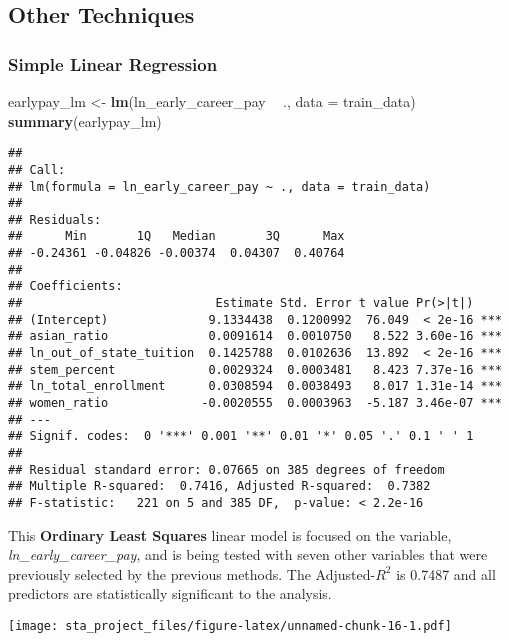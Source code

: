 \documentclass[
]{article}
\newenvironment{Shaded}{\begin{snugshade}}{\end{snugshade}}
\newcommand{\DataTypeTok}[1]{\textcolor[rgb]{0.13,0.29,0.53}{#1}}
\newcommand{\KeywordTok}[1]{\textcolor[rgb]{0.13,0.29,0.53}{\textbf{#1}}}
\newcommand{\NormalTok}[1]{#1}
\newcommand{\OperatorTok}[1]{\textcolor[rgb]{0.81,0.36,0.00}{\textbf{#1}}}
\newcommand{\StringTok}[1]{\textcolor[rgb]{0.31,0.60,0.02}{#1}}
\begin{document}
\hypertarget{other-techniques}{%
\subsection{Other Techniques}\label{other-techniques}}

\hypertarget{simple-linear-regression}{%
\subsubsection{Simple Linear
Regression}\label{simple-linear-regression}}

\begin{Shaded}
\begin{Highlighting}[]
\NormalTok{earlypay_lm <-}\StringTok{ }\KeywordTok{lm}\NormalTok{(ln_early_career_pay }\OperatorTok{~}\StringTok{ }\NormalTok{., }
                  \DataTypeTok{data =}\NormalTok{ train_data)}
\KeywordTok{summary}\NormalTok{(earlypay_lm)}
\end{Highlighting}
\end{Shaded}

\begin{verbatim}
## 
## Call:
## lm(formula = ln_early_career_pay ~ ., data = train_data)
## 
## Residuals:
##      Min       1Q   Median       3Q      Max 
## -0.24361 -0.04826 -0.00374  0.04307  0.40764 
## 
## Coefficients:
##                           Estimate Std. Error t value Pr(>|t|)    
## (Intercept)              9.1334438  0.1200992  76.049  < 2e-16 ***
## asian_ratio              0.0091614  0.0010750   8.522 3.60e-16 ***
## ln_out_of_state_tuition  0.1425788  0.0102636  13.892  < 2e-16 ***
## stem_percent             0.0029324  0.0003481   8.423 7.37e-16 ***
## ln_total_enrollment      0.0308594  0.0038493   8.017 1.31e-14 ***
## women_ratio             -0.0020555  0.0003963  -5.187 3.46e-07 ***
## ---
## Signif. codes:  0 '***' 0.001 '**' 0.01 '*' 0.05 '.' 0.1 ' ' 1
## 
## Residual standard error: 0.07665 on 385 degrees of freedom
## Multiple R-squared:  0.7416, Adjusted R-squared:  0.7382 
## F-statistic:   221 on 5 and 385 DF,  p-value: < 2.2e-16
\end{verbatim}

This \textbf{Ordinary Least Squares} linear model is focused on the
variable, \emph{ln\_early\_career\_pay}, and is being tested with seven
other variables that were previously selected by the previous methods.
The Adjusted-\(R^2\) is 0.7487 and all predictors are statistically
significant to the analysis.

\texttt{[image: sta\_project\_files/figure-latex/unnamed-chunk-16-1.pdf]}
\end{document}
